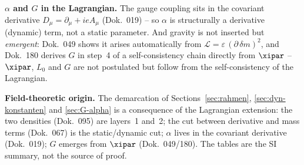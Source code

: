 \textbf{$\alpha$ and $G$ in the Lagrangian.} The gauge coupling sits in the
covariant derivative $D_\mu = \partial_\mu + ieA_\mu$ (Dok.~019) -- so $\alpha$ is
structurally a derivative (dynamic) term, not a static parameter. And gravity is
not inserted but \emph{emergent}: Dok.~049 shows it arises automatically from
$\mathcal{L} = \varepsilon\,(\partial\,\delta m)^2$, and Dok.~180 derives $G$ in
step~4 of a self-consistency chain directly from $\xipar$ -- $\xipar$, $L_0$ and
$G$ are not postulated but follow from the self-consistency of the Lagrangian.

\begin{result}
\textbf{Field-theoretic origin.} The demarcation of
Sections~\ref{sec:rahmen}, \ref{sec:dyn-konstanten} and \ref{sec:G-alpha} is a
consequence of the Lagrangian extension: the two densities (Dok.~095) are layers~1
and~2; the cut between derivative and mass terms (Dok.~067) is the static/dynamic
cut; $\alpha$ lives in the covariant derivative (Dok.~019); $G$ emerges from
$\xipar$ (Dok.~049/180). The tables are the SI summary, not the source of proof.
\end{result}
